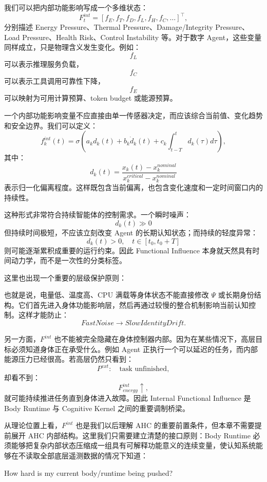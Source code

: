 我们可以把内部功能影响写成一个多维状态：
\[
F_t^{int}
=
[
f_E,
f_T,
f_D,
f_L,
f_H,
f_C,\ldots
]^\top,
\]
分别描述 Energy Pressure、Thermal Pressure、Damage/Integrity Pressure、Load Pressure、Health Risk、Control Instability 等。对于数字 Agent，这些变量同样成立，只是物理含义发生变化。例如：
\[
f_L
\]
可以表示推理服务负载，
\[
f_C
\]
可以表示工具调用可靠性下降，
\[
f_E
\]
可以映射为可用计算预算、token budget 或能源预算。

一个内部功能影响变量不应直接由单一传感器决定，而应该综合当前值、变化趋势和安全边界。我们可以定义：
\[
f_k^{int}(t)
=
\sigma
\left(
a_k d_k(t)
+
b_k \dot d_k(t)
+
c_k \int_{t-T}^{t} d_k(\tau)d\tau
\right),
\]
其中：
\[
d_k(t)
=
\frac{x_k(t)-x_k^{nominal}}
{x_k^{critical}-x_k^{nominal}}
\]
表示归一化偏离程度。这样既包含当前偏离，也包含变化速度和一定时间窗口内的持续性。

这种形式非常符合持续智能体的控制需求。一个瞬时噪声：
\[
d_k(t)\gg0
\]
但持续时间极短，不应该立刻改变 Agent 的长期认知状态；而持续的轻度异常：
\[
d_k(t)>0,\quad t\in[t_0,t_0+T]
\]
则可能逐渐累积成重要的运行约束。因此 Functional Influence 本身就天然具有时间动力学，而不是一次性的分类标签。

这里也出现一个重要的层级保护原则：
\begin{statementbox}
\centering
{}
\end{statementbox}
也就是说，电量低、温度高、CPU 满载等身体状态不能直接修改 $\Psi$ 或长期身份结构。它们首先进入身体功能影响层，然后再通过较慢的整合机制影响当前认知控制。这样才能防止：
\[
FastNoise
\rightarrow
SlowIdentityDrift.
\]

另一方面，$F^{int}$ 也不能被完全隐藏在身体控制器内部。因为在某些情况下，高层目标必须知道身体正在承受什么。例如 Agent 正执行一个可以延迟的任务，而内部能源压力已经很高。若高层仍然只看到：
\[
P^{ext}:
\quad
\text{task unfinished},
\]
却看不到：
\[
F^{int}_{energy}\uparrow,
\]
就可能持续推进任务直到身体进入故障。因此 Internal Functional Influence 是 Body Runtime 与 Cognitive Kernel 之间的重要调制桥梁。

从理论位置上看，$F^{int}$ 也是我们以后理解 AHC 的重要前置条件，但本章不需要提前展开 AHC 内部结构。这里我们只需要建立清楚的接口原则：Body Runtime 必须能够把复杂内部状态压缩成一组具有可解释功能意义的连续变量，使认知系统能够在不读取全部底层遥测数据的情况下知道：
\begin{proposition*}
How hard is my current body/runtime being pushed?
\end{proposition*}

